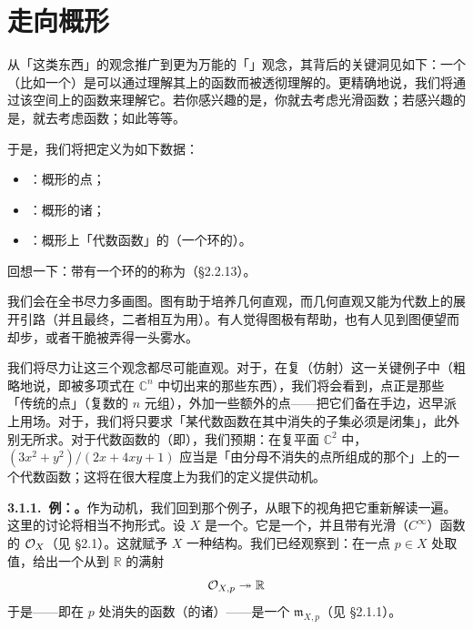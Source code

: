 
\section{走向概形}

从「\trManifold{}这类东西」的观念推广到更为万能的「\trGeometricSpace」观念，其背后的关键洞见如下：一个\trGeometricSpace{}（比如一个\trManifold{}）是可以通过理解其上的函数而被透彻理解的。更精确地说，我们将通过该空间上的函数\trSheaf{}来理解它。若你感兴趣的是\trDifferentiable\trManifold，你就去考虑光滑函数；若感兴趣的是\trAnalytic\trManifold，就去考虑\trReal\trAnalytic{}函数；如此等等。

于是，我们将把\trScheme{}定义为如下数据：
\begin{itemize}
\item \emph{\trSet}：概形的点；
\item \emph{\trTopology}：概形的诸\trOpenSet；
\item \emph{\trStructureSheaf}：概形上「代数函数」的\trSheaf{}（一个环的\trSheaf{}）。
\end{itemize}

回想一下：带有一个环的\trSheaf{}的\trTopologicalSpace{}称为\trRingedSpace{}（\S2.2.13）。

我们会在全书尽力多画图。图有助于培养几何直观，而几何直观又能为代数上的展开引路（并且最终，二者相互为用）。有人觉得图极有帮助，也有人见到图便望而却步，或者干脆被弄得一头雾水。

我们将尽力让这三个观念都尽可能直观。对于\trSet，在复（仿射）\trVariety{}这一关键例子中（粗略地说，即被多项式在 $\mathbb{C}^n$ 中切出来的那些东西），我们将会看到，点正是那些「传统的点」（复数的 $n$ 元组），外加一些额外的点——把它们备在手边，迟早派上用场。对于\trTopology，我们将只要求「某代数函数在其中消失的子集必须是闭集」，此外别无所求。对于代数函数的\trSheaf{}（即\trStructureSheaf），我们预期：在复平面 $\mathbb{C}^2$ 中，$(3x^2+y^2)/(2x+4xy+1)$ 应当是「由分母不消失的点所组成的那个\trOpenSet{}」上的一个代数函数；这将在很大程度上为我们的定义提供动机。

\textbf{3.1.1.\ 例：\trDifferentiable\trManifold。}\quad 作为动机，我们回到\trDifferentiable\trManifold{}那个例子，从眼下的视角把它重新解读一遍。这里的讨论将相当不拘形式。设 $X$ 是一个\trDifferentiable\trManifold。它是一个\trTopologicalSpace，并且带有光滑（$C^\infty$）函数的\trSheaf{} $\mathcal{O}_X$（见 \S2.1）。这就赋予 $X$ 一种\trRingedSpace{}结构。我们已经观察到：在一点 $p\in X$ 处取值，给出一个从\trStalk{}到 $\mathbb{R}$ 的满射
\[
\mathcal{O}_{X,p}\twoheadrightarrow\mathbb{R}
\]
于是\trKernel——即在 $p$ 处消失的函数（的诸\trGerm{}）——是一个\trMaximalIdeal{} $\mathfrak{m}_{X,p}$（见 \S2.1.1）。

